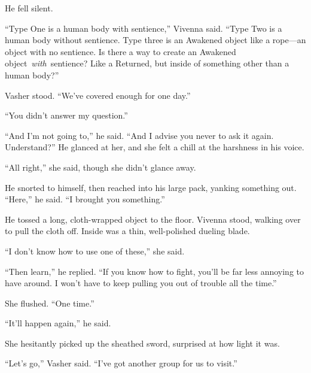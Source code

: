He fell silent.

“Type One is a human body with sentience,” Vivenna said. “Type Two is a human body without sentience. Type three is an Awakened object like a rope—an object with no sentience. Is there a way to create an Awakened object~\textit{with}~sentience? Like a Returned, but inside of something other than a human body?”

Vasher stood. “We’ve covered enough for one day.”

“You didn’t answer my question.”

“And I’m not going to,” he said. “And I advise you never to ask it again. Understand?” He glanced at her, and she felt a chill at the harshness in his voice.

“All right,” she said, though she didn’t glance away.

He snorted to himself, then reached into his large pack, yanking something out. “Here,” he said. “I brought you something.”

He tossed a long, cloth-wrapped object to the floor. Vivenna stood, walking over to pull the cloth off. Inside was a thin, well-polished dueling blade.

“I don’t know how to use one of these,” she said.

“Then learn,” he replied. “If you know how to fight, you’ll be far less annoying to have around. I won’t have to keep pulling you out of trouble all the time.”

She flushed. “One time.”

“It’ll happen again,” he said.

She hesitantly picked up the sheathed sword, surprised at how light it was.

“Let’s go,” Vasher said. “I’ve got another group for us to visit.”

